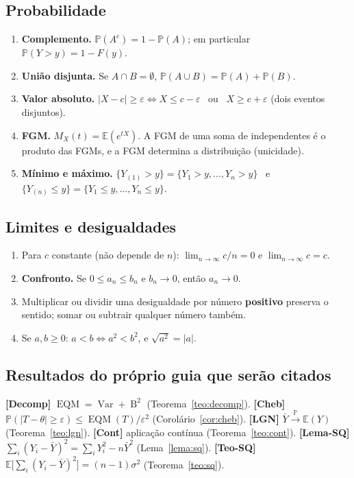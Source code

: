 \documentclass[11pt,a4paper]{article}
\theoremstyle{definition}
\theoremstyle{plain}
\newcommand{\E}{\mathbb{E}}
\newcommand{\Var}{\operatorname{Var}}
\newcommand{\EQM}{\operatorname{EQM}}
\newcommand{\B}{\operatorname{B}}
\newcommand{\Prob}{\mathbb{P}}
\newcommand{\convP}{\xrightarrow{\;\Prob\;}}
\newcommand{\bY}{\bar{Y}}
\begin{document}
\subsection*{Probabilidade}
\begin{enumerate}[label=\textbf{(Pr\arabic*)},leftmargin=3.6em]
\item \textbf{Complemento.} $\Prob(A^c)=1-\Prob(A)$; em particular $\Prob(Y>y)=1-F(y)$.
\item \textbf{União disjunta.} Se $A\cap B=\emptyset$, $\Prob(A\cup B)=\Prob(A)+\Prob(B)$.
\item \textbf{Valor absoluto.} $|X-c|\ge\varepsilon \iff X\le c-\varepsilon$ \ ou \ $X\ge c+\varepsilon$ (dois eventos disjuntos).
\item \textbf{FGM.} $M_X(t)=\E(e^{tX})$. A FGM de uma soma de independentes é o produto das FGMs, e a FGM determina a distribuição (unicidade).
\item \textbf{Mínimo e máximo.} $\{Y_{(1)}>y\}=\{Y_1>y,\dots,Y_n>y\}$ \ e \ $\{Y_{(n)}\le y\}=\{Y_1\le y,\dots,Y_n\le y\}$.
\end{enumerate}

\subsection*{Limites e desigualdades}
\begin{enumerate}[label=\textbf{(Li\arabic*)},leftmargin=3.6em]
\item Para $c$ constante (não depende de $n$): $\lim_{n\to\infty} c/n=0$ e $\lim_{n\to\infty}c=c$.
\item \textbf{Confronto.} Se $0\le a_n\le b_n$ e $b_n\to0$, então $a_n\to0$.
\item Multiplicar ou dividir uma desigualdade por número \textbf{positivo} preserva o sentido; somar ou subtrair qualquer número também.
\item Se $a,b\ge0$: $a<b\iff a^2<b^2$, e $\sqrt{a^2}=|a|$.
\end{enumerate}

\subsection*{Resultados do próprio guia que serão citados}
\textbf{[Decomp]} $\EQM=\Var+\B^2$ (Teorema~\ref{teo:decomp}). \quad
\textbf{[Cheb]} $\Prob(|T-\theta|\ge\varepsilon)\le\EQM(T)/\varepsilon^2$ (Corolário~\ref{cor:cheb}). \quad
\textbf{[LGN]} $\bY\convP\E(Y)$ (Teorema~\ref{teo:lgn}). \quad
\textbf{[Cont]} aplicação contínua (Teorema~\ref{teo:cont}). \quad
\textbf{[Lema-SQ]} $\sum_i(Y_i-\bY)^2=\sum_iY_i^2-n\bY^2$ (Lema~\ref{lema:sq}). \quad
\textbf{[Teo-SQ]} $\E\big[\sum_i(Y_i-\bY)^2\big]=(n-1)\sigma^2$ (Teorema~\ref{teo:sq}).
\end{document}
